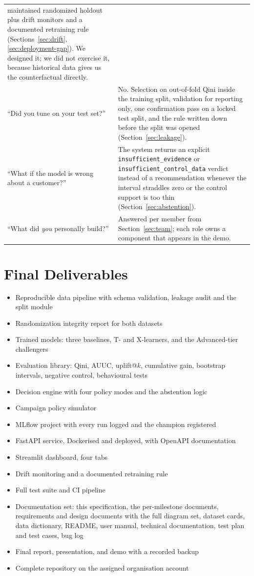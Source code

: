 \documentclass[11pt,a4paper]{article}
\begin{document}
\begin{longtable}{@{}L{6.6cm}L{8.0cm}@{}}
maintained randomized holdout plus drift monitors and a documented retraining rule
(Sections~\ref{sec:drift}, \ref{sec:deployment-gap}). We designed it; we did not exercise it,
because historical data gives us the counterfactual directly. \\
``Did you tune on your test set?'' & No. Selection on out-of-fold Qini inside the training split,
validation for reporting only, one confirmation pass on a locked test split, and the rule written down before the split was opened
(Section~\ref{sec:leakage}). \\
``What if the model is wrong about a customer?'' & The system returns an explicit
\texttt{insufficient\_evidence} or \texttt{insufficient\_control\_data} verdict instead of a
recommendation whenever the interval straddles zero or the control support is too thin
(Section~\ref{sec:abstention}). \\
``What did \emph{you} personally build?'' & Answered per member from Section~\ref{sec:team}; each
role owns a component that appears in the demo. \\
\bottomrule
\end{longtable}

\section{Final Deliverables}

\begin{itemize}
\item Reproducible data pipeline with schema validation, leakage audit and the split module
\item Randomization integrity report for both datasets
\item Trained models: three baselines, T- and X-learners, and the Advanced-tier challengers
\item Evaluation library: Qini, AUUC, uplift@$k$, cumulative gain, bootstrap intervals, negative
control, behavioural tests
\item Decision engine with four policy modes and the abstention logic
\item Campaign policy simulator
\item MLflow project with every run logged and the champion registered
\item FastAPI service, Dockerised and deployed, with OpenAPI documentation
\item Streamlit dashboard, four tabs
\item Drift monitoring and a documented retraining rule
\item Full test suite and CI pipeline
\item Documentation set: this specification, the per-milestone documents, requirements and
design documents with the full diagram set, dataset cards, data dictionary, README, user manual,
technical documentation, test plan and test cases, bug log
\item Final report, presentation, and demo with a recorded backup
\item Complete repository on the assigned organisation account
\end{itemize}
\end{document}
